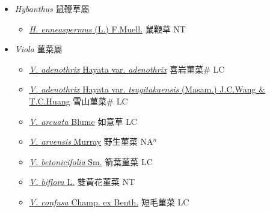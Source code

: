 
  \begin{itemize}
 \item[] \textit{Hybanthus} 鼠鞭草屬
                    
  \begin{itemize}
        \item[] \href{http://www.theplantlist.org/tpl1.1/search?q=Hybanthus+enneaspermus}{\textit{H. enneaspermus} (L.) F.Muell.}   鼠鞭草 NT
  \end{itemize}
 \item[] \textit{Viola} 菫菜屬
                    
  \begin{itemize}
        \item[] \href{http://www.theplantlist.org/tpl1.1/search?q=Viola+adenothrix+var.+adenothrix}{\textit{V. adenothrix} Hayata var. \textit{adenothrix}}   喜岩菫菜\# LC
        \item[] \href{http://www.theplantlist.org/tpl1.1/search?q=Viola+adenothrix+var.+tsugitakaensis}{\textit{V. adenothrix} Hayata var. \textit{tsugitakaensis} (Masam.) J.C.Wang \& T.C.Huang}   雪山菫菜\# LC
        \item[] \href{http://www.theplantlist.org/tpl1.1/search?q=Viola+arcuata}{\textit{V. arcuata} Blume}   如意草 LC
        \item[] \href{http://www.theplantlist.org/tpl1.1/search?q=Viola+arvensis}{\textit{V. arvensis} Murray}   野生菫菜 NA$^n$
        \item[] \href{http://www.theplantlist.org/tpl1.1/search?q=Viola+betonicifolia}{\textit{V. betonicifolia} Sm.}   箭葉菫菜 LC
        \item[] \href{http://www.theplantlist.org/tpl1.1/search?q=Viola+biflora}{\textit{V. biflora} L.}   雙黃花菫菜 NT
        \item[] \href{http://www.theplantlist.org/tpl1.1/search?q=Viola+confusa}{\textit{V. confusa} Champ. ex Benth.}   短毛菫菜 LC

\end{itemize}
\end{itemize}
